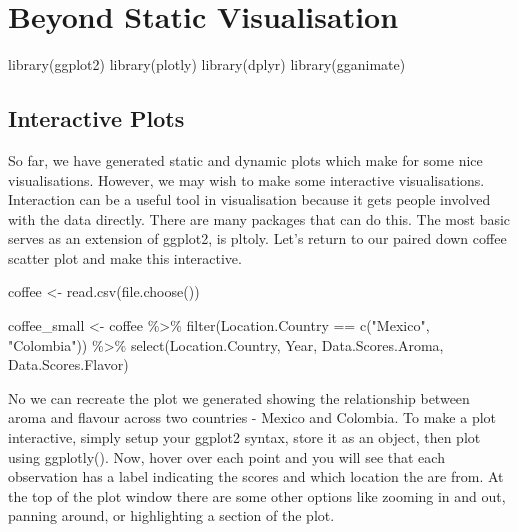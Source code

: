 \documentclass[
  letterpaper,
  DIV=11,
  numbers=noendperiod]{scrreprt}
\newenvironment{Shaded}{\begin{snugshade}}{\end{snugshade}}
\newcommand{\FunctionTok}[1]{\textcolor[rgb]{0.28,0.35,0.67}{#1}}
\newcommand{\NormalTok}[1]{\textcolor[rgb]{0.00,0.23,0.31}{#1}}
\newcommand{\OtherTok}[1]{\textcolor[rgb]{0.00,0.23,0.31}{#1}}
\newcommand{\SpecialCharTok}[1]{\textcolor[rgb]{0.37,0.37,0.37}{#1}}
\newcommand{\StringTok}[1]{\textcolor[rgb]{0.13,0.47,0.30}{#1}}
\begin{document}
\chapter{Beyond Static Visualisation}\label{beyond-static-visualisation}

\begin{Shaded}
\begin{Highlighting}[]
\FunctionTok{library}\NormalTok{(ggplot2)}
\FunctionTok{library}\NormalTok{(plotly)}
\FunctionTok{library}\NormalTok{(dplyr)}
\FunctionTok{library}\NormalTok{(gganimate)}
\end{Highlighting}
\end{Shaded}

\section{Interactive Plots}\label{interactive-plots}

So far, we have generated static and dynamic plots which make for some
nice visualisations. However, we may wish to make some interactive
visualisations. Interaction can be a useful tool in visualisation
because it gets people involved with the data directly. There are many
packages that can do this. The most basic serves as an extension of
ggplot2, is pltoly. Let's return to our paired down coffee scatter plot
and make this interactive.

\begin{Shaded}
\begin{Highlighting}[]
\NormalTok{coffee }\OtherTok{\textless{}{-}} \FunctionTok{read.csv}\NormalTok{(}\FunctionTok{file.choose}\NormalTok{())}

\NormalTok{coffee\_small }\OtherTok{\textless{}{-}}\NormalTok{ coffee }\SpecialCharTok{\%\textgreater{}\%}
  \FunctionTok{filter}\NormalTok{(Location.Country }\SpecialCharTok{==} \FunctionTok{c}\NormalTok{(}\StringTok{"Mexico"}\NormalTok{, }\StringTok{"Colombia"}\NormalTok{)) }\SpecialCharTok{\%\textgreater{}\%}
  \FunctionTok{select}\NormalTok{(Location.Country, Year, Data.Scores.Aroma, Data.Scores.Flavor)}
\end{Highlighting}
\end{Shaded}

No we can recreate the plot we generated showing the relationship
between aroma and flavour across two countries - Mexico and Colombia. To
make a plot interactive, simply setup your ggplot2 syntax, store it as
an object, then plot using ggplotly(). Now, hover over each point and
you will see that each observation has a label indicating the scores and
which location the are from. At the top of the plot window there are
some other options like zooming in and out, panning around, or
highlighting a section of the plot.
\end{document}
